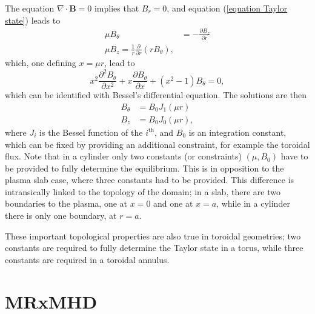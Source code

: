 \documentclass[my_thesis.tex]{subfiles}
\begin{document}
The equation $\nabla\cdot\mathbf{B}=0$ implies that $B_r=0$, and equation (\ref{equation Taylor state}) leads to
\begin{align}
	\mu B_\theta &= -\frac{\partial B_z}{\partial r}\\
	\mu B_z = \frac{1}{r}\frac{\partial}{\partial r}(rB_\theta),
\end{align}
which, one defining $x=\mu r$, lead to 
\begin{equation}
	x^2 \frac{\partial^2 B_\theta}{\partial x^2} + x \frac{\partial B_\theta}{\partial x} + (x^2-1) B_\theta = 0,
\end{equation}
which can be identified with Bessel's differential equation. The solutions are then
\begin{align}
	B_\theta &= B_0 J_1(\mu r)\\
	B_z &= B_0 J_0(\mu r),
\end{align}
where $J_i$ is the Bessel function of the $i^{\text{th}}$, and $B_0$ is an integration constant, which can be fixed by providing an additional constraint, for example the toroidal flux. Note that in a cylinder only two constants (or constraints) $(\mu,B_0)$ have to be provided to fully determine the equilibrium. This is in opposition to the plasma slab case, where three constants had to be provided. This difference is intransically linked to the topology of the domain; in a slab, there are two boundaries to the plasma, one at $x=0$ and one at $x=a$, while in a cylinder there is only one boundary, at $r=a$. 

These important topological properties are also true in toroidal geometries; two constants are required to fully determine the Taylor state in a torus, while three constants are required in a toroidal annulus.

\section{MRxMHD}
\label{section mrxmhd}
\end{document}
